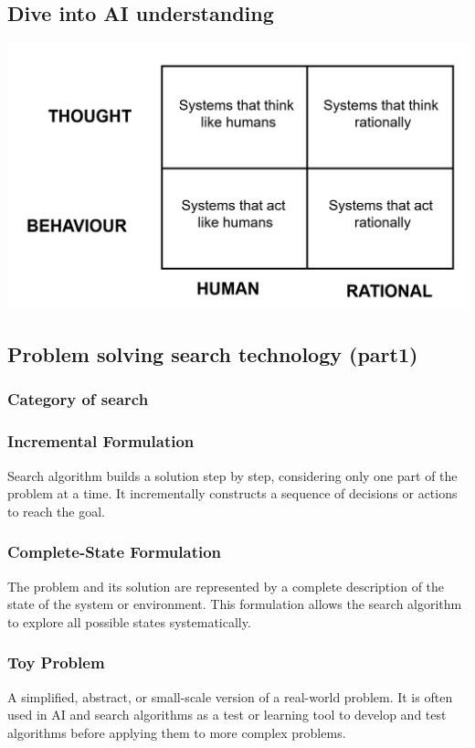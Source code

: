 \documentclass[a4paper, 12pt]{article}
\begin{document}
    \subsection{Dive into AI understanding}
    \includegraphics[width=\textwidth]{w1_1.png}

    \subsection{Problem solving search technology (part1)}
    \subsubsection{Category of search}
        \subsubsection*{Incremental Formulation}
        Search algorithm builds a solution step by step, considering only one part of the problem at a time. It incrementally constructs a sequence of decisions or actions to reach the goal.
        \subsubsection*{Complete-State Formulation}
        The problem and its solution are represented by a complete description of the state of the system or environment. This formulation allows the search algorithm to explore all possible states systematically.
        \subsubsection*{Toy Problem}
        A simplified, abstract, or small-scale version of a real-world problem. It is often used in AI and search algorithms as a test or learning tool to develop and test algorithms before applying them to more complex problems.
\end{document}
